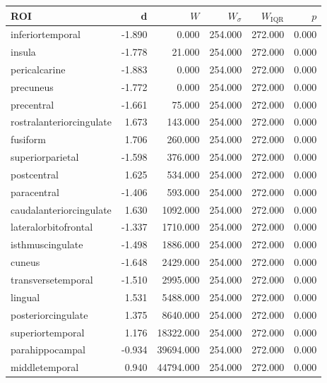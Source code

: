 \documentclass{article}
\begin{document}
\begin{table}
\centering
\begin{tabular}{lrrrrr}
	\toprule
	ROI & d &  \(W\) & \(W_{\sigma}\) & \(W_{\text{IQR}}\) & \(p\) \\
	\midrule
	inferiortemporal         & -1.890 &  0.000      & 254.000 & 272.000 & 0.000 \\
	insula                   & -1.778 &  21.000     & 254.000 & 272.000 & 0.000 \\
	pericalcarine            & -1.883 &  0.000      & 254.000 & 272.000 & 0.000 \\
	precuneus                & -1.772 &  0.000      & 254.000 & 272.000 & 0.000 \\
	precentral               & -1.661 &  75.000     & 254.000 & 272.000 & 0.000 \\
	rostralanteriorcingulate & 1.673  &  143.000    & 254.000 & 272.000 & 0.000 \\
	fusiform                 & 1.706  &  260.000    & 254.000 & 272.000 & 0.000 \\
	superiorparietal         & -1.598 &  376.000    & 254.000 & 272.000 & 0.000 \\
	postcentral              & 1.625  &  534.000    & 254.000 & 272.000 & 0.000 \\
	paracentral              & -1.406 &  593.000    & 254.000 & 272.000 & 0.000 \\
	caudalanteriorcingulate  & 1.630  &  1092.000   & 254.000 & 272.000 & 0.000 \\
	lateralorbitofrontal     & -1.337 &  1710.000   & 254.000 & 272.000 & 0.000 \\
	isthmuscingulate         & -1.498 &  1886.000   & 254.000 & 272.000 & 0.000 \\
	cuneus                   & -1.648 &  2429.000   & 254.000 & 272.000 & 0.000 \\
	transversetemporal       & -1.510 &  2995.000   & 254.000 & 272.000 & 0.000 \\
	lingual                  &  1.531 &  5488.000   & 254.000 & 272.000 & 0.000 \\
	posteriorcingulate       &  1.375 &  8640.000   & 254.000 & 272.000 & 0.000 \\
	superiortemporal         &  1.176 &  18322.000  & 254.000 & 272.000 & 0.000 \\
	parahippocampal          & -0.934 &  39694.000  & 254.000 & 272.000 & 0.000 \\
	middletemporal           &  0.940 &  44794.000  & 254.000 & 272.000 & 0.000 \\

\end{tabular}
\end{table}
\end{document}
